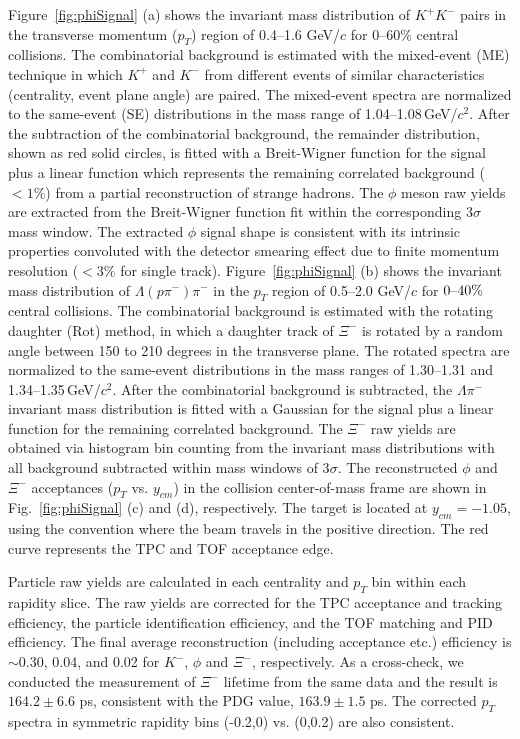 \documentclass[%
 reprint,	
showpacs,
 amsmath,amssymb,
 aps,
 superscriptaddress,
]{revtex4-1}
\begin{document}
Figure~\ref{fig:phiSignal} (a) shows the invariant mass distribution of $K^+K^-$ pairs in the transverse momentum ($p_{T}$) region of 0.4--1.6 GeV/$c$ for 0--60\% central collisions. The combinatorial background is estimated with the mixed-event (ME) technique in which $K^+$ and $K^-$ from different events of similar characteristics (centrality, event plane angle) are paired. The mixed-event spectra are normalized to the same-event (SE) distributions in the mass range of 1.04--1.08\,GeV/$c^2$. After the subtraction of the combinatorial background, the remainder distribution, shown as red solid circles, 
is fitted with a Breit-Wigner function for the signal plus a linear function which represents the remaining correlated background ($< 1\%$) from a partial reconstruction of strange hadrons. The $\phi$ meson raw yields are extracted from the Breit-Wigner function fit within the corresponding 3$\sigma$ mass window. The extracted $\phi$ signal shape is consistent with its intrinsic properties convoluted with the detector smearing effect due to finite momentum resolution ($<3\%$ for single track).
Figure~\ref{fig:phiSignal} (b) shows the invariant mass distribution of $\Lambda(p\pi^-)\pi^-$ in the $p_{T}$ region of 0.5--2.0 GeV/$c$ for $\textup{0--40\%}$ central collisions. The combinatorial background is estimated with the rotating daughter (Rot) method, in which a daughter track of $\Xi^-$ is rotated by a random angle between 150 to 210 degrees in the transverse plane. The rotated spectra are normalized to the same-event distributions in the mass ranges of 1.30--1.31 and 1.34--1.35\,GeV/$c^2$. After the combinatorial background is subtracted, the $\Lambda\pi^-$ invariant mass distribution is fitted with a Gaussian for the signal plus a linear function for the remaining correlated background. The $\Xi^-$ raw yields are obtained via histogram bin counting from the invariant mass distributions with all background subtracted within mass windows of 3$\sigma$. The reconstructed $\phi$ and $\Xi^-$ acceptances ($p_T$ vs. $y_{cm}$) in the collision center-of-mass frame are shown in Fig.~\ref{fig:phiSignal} (c) and (d), respectively.
The target is located at $y_{cm} = -1.05$, using the convention where the beam travels in the positive direction. The red curve represents the TPC and TOF acceptance edge. %

Particle
raw yields are calculated in each centrality and $p_{T}$ bin within each rapidity slice. 
The raw yields are corrected for the TPC acceptance and tracking efficiency, %
the particle identification efficiency, %
and the TOF matching and PID efficiency. The final average reconstruction (including acceptance etc.) efficiency is $\sim$0.30, 0.04, and 0.02 for $K^-$, $\phi$ and $\Xi^-$, respectively. As a cross-check, we conducted the measurement of $\Xi^{-}$ lifetime from the same data and the result is $164.2\pm6.6$ ps, consistent with the PDG value, $163.9\pm1.5$ ps. The corrected $p_T$ spectra in symmetric rapidity bins (-0.2,0) vs. (0,0.2) are also consistent.
\end{document}
